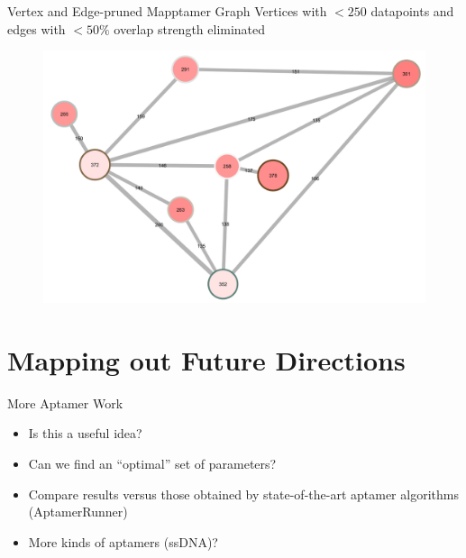 \documentclass{beamer}
\begin{document}
\begin{frame}{Vertex and Edge-pruned Mapptamer Graph}
  Vertices with $<250$ datapoints and edges with $<50\%$ overlap strength eliminated
  \begin{figure}
    \begin{center}
      \includegraphics[width=.9\textwidth]{vertexandedgeprune.png}
    \end{center}
  \end{figure}
\end{frame}



\section{Mapping out Future Directions}

\begin{frame}{More Aptamer Work}
  \begin{itemize}
    \item Is this a useful idea?
    \item Can we find an ``optimal'' set of parameters?
    \item Compare results versus those obtained by state-of-the-art aptamer algorithms (AptamerRunner)
    \item More kinds of aptamers (ssDNA)?
  \end{itemize}
\end{frame}
\end{document}
